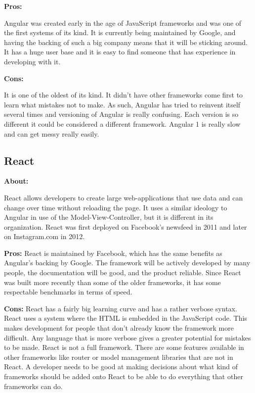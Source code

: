 \documentclass[draftclsnofoot,onecolumn,letterpaper,10pt,compsoc]{IEEEtran}
\begin{document}
    \noindent \textbf{Pros:}

    Angular was created early in the age of JavaScript frameworks and was one of the first systems of its kind.
    It is currently being maintained by Google, and having the backing of such a big company means that it will be sticking around.
    It has a huge user base and it is easy to find someone that has experience in developing with it.

    \noindent \textbf{Cons:}

    It is one of the oldest of its kind.
    It didn't have other frameworks come first to learn what mistakes not to make.
    As such, Angular has tried to reinvent itself several times and versioning of Angular is really confusing. Each version is so different it could be considered a different framework.
    Angular 1 is really slow\cite{SpeedReport} and can get messy really easily.


	\subsection{React}
    \textbf{About:}

    React allows developers to create large web-applications that use data and can change over time without reloading the page.
    It uses a similar ideology to Angular in use of the Model-View-Controller, but it is different in its organization.
    React was first deployed on Facebook's newsfeed in 2011 and later on Instagram.com in 2012.

    \textbf{Pros:}
    React is maintained by Facebook, which has the same benefits as Angular's backing by Google.
    The framework will be actively developed by many people, the documentation will be good, and the product reliable.
    Since React was built more recently than some of the older frameworks, it has some respectable benchmarks in terms of speed.\cite{SpeedReport}

    \textbf{Cons:}
    React has a fairly big learning curve and has a rather verbose syntax.
    React uses a system where the HTML is embedded in the JavaScript code.
    This makes development for people that don't already know the framework more difficult.
    Any language that is more verbose gives a greater potential for mistakes to be made.
    React is not a full framework.
    There are some features available in other frameworks like router or model management libraries that are not in React.
    A developer needs to be good at making decisions about what kind of frameworks should be added onto React to be able to do everything that other frameworks can do.
\end{document}
